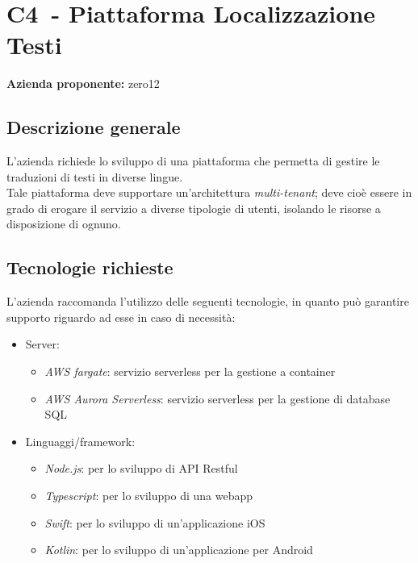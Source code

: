 
\renewcommand{\capName}{Piattaforma Localizzazione Testi} %
\renewcommand{\capCode}{C4} %
\renewcommand{\capLink}{https://www.math.unipd.it/~tullio/IS-1/2022/Progetto/C3.pdf} %
\renewcommand{\capProposer}{zero12} %


\section{\capCode\ - \capName}
\textbf{Azienda proponente:} zero12
\subsection{Descrizione generale}
L'azienda richiede lo sviluppo di una piattaforma che permetta di gestire le traduzioni di testi in diverse lingue. \\
Tale piattaforma deve supportare un'architettura \textit{multi-tenant}; deve cioè essere in grado di erogare il servizio a diverse tipologie di utenti, isolando le risorse a disposizione di ognuno.

\subsection{Tecnologie richieste}
L'azienda raccomanda l'utilizzo delle seguenti tecnologie, in quanto può garantire supporto riguardo ad esse in caso di necessità:
\begin{itemize}
    \item Server:
        \begin{itemize}
            \item \emph{AWS fargate}: servizio serverless per la gestione a container
            \item \emph{AWS Aurora Serverless}: servizio serverless per la gestione di database SQL
        \end{itemize}
    \item Linguaggi/framework:
        \begin{itemize}
            \item \emph{Node.js}: per lo sviluppo di API Restful
            \item \emph{Typescript}: per lo sviluppo di una webapp
            \item \emph{Swift}: per lo sviluppo di un'applicazione iOS
            \item \emph{Kotlin}: per lo sviluppo di un'applicazione per Android
        \end{itemize}
\end{itemize}

